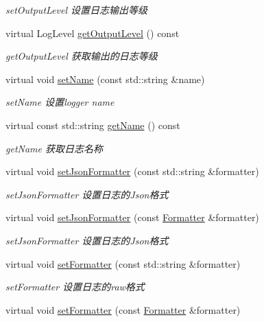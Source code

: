\begin{DoxyCompactItemize}
\begin{DoxyCompactList}\small\item\em set\+Output\+Level 设置日志输出等级 \end{DoxyCompactList}\item 
virtual Log\+Level \hyperlink{classdaq_1_1Logger_a25447b37351baad0044153f25919430a}{get\+Output\+Level} () const
\begin{DoxyCompactList}\small\item\em get\+Output\+Level 获取输出的日志等级 \end{DoxyCompactList}\item 
virtual void \hyperlink{classdaq_1_1Logger_a476bf0f707e09f1a596b0b866bde21fa}{set\+Name} (const std\+::string \&name)
\begin{DoxyCompactList}\small\item\em set\+Name 设置logger name \end{DoxyCompactList}\item 
virtual const std\+::string \hyperlink{classdaq_1_1Logger_af73ff307b7834b731cf6cc17148a36e5}{get\+Name} () const
\begin{DoxyCompactList}\small\item\em get\+Name 获取日志名称 \end{DoxyCompactList}\item 
virtual void \hyperlink{classdaq_1_1Logger_a1c3bc00ae27695474c7f054bdabc67c8}{set\+Json\+Formatter} (const std\+::string \&formatter)
\begin{DoxyCompactList}\small\item\em set\+Json\+Formatter 设置日志的\+Json格式 \end{DoxyCompactList}\item 
virtual void \hyperlink{classdaq_1_1Logger_a6ce72b03ca3604ca2600a0bfe25e5006}{set\+Json\+Formatter} (const \hyperlink{classdaq_1_1Formatter}{Formatter} \&formatter)
\begin{DoxyCompactList}\small\item\em set\+Json\+Formatter 设置日志的\+Json格式 \end{DoxyCompactList}\item 
virtual void \hyperlink{classdaq_1_1Logger_a0d75dceef7a9633572760853ae19afdc}{set\+Formatter} (const std\+::string \&formatter)
\begin{DoxyCompactList}\small\item\em set\+Formatter 设置日志的raw格式 \end{DoxyCompactList}\item 
virtual void \hyperlink{classdaq_1_1Logger_a23d83680637cd9d67ea9d2e039f38176}{set\+Formatter} (const \hyperlink{classdaq_1_1Formatter}{Formatter} \&formatter)

\end{DoxyCompactItemize}
